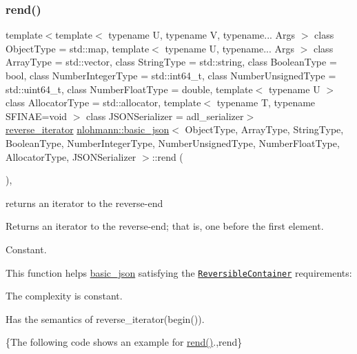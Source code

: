 \subsubsection{\texorpdfstring{rend()}{rend()}\hspace{0.1cm}{\footnotesize\ttfamily [1/2]}}
{\footnotesize\ttfamily template$<$template$<$ typename U, typename V, typename... Args $>$ class Object\+Type = std\+::map, template$<$ typename U, typename... Args $>$ class Array\+Type = std\+::vector, class String\+Type  = std\+::string, class Boolean\+Type  = bool, class Number\+Integer\+Type  = std\+::int64\+\_\+t, class Number\+Unsigned\+Type  = std\+::uint64\+\_\+t, class Number\+Float\+Type  = double, template$<$ typename U $>$ class Allocator\+Type = std\+::allocator, template$<$ typename T, typename S\+F\+I\+N\+A\+E=void $>$ class J\+S\+O\+N\+Serializer = adl\+\_\+serializer$>$ \\
\mbox{\hyperlink{classnlohmann_1_1basic__json_ac223d5560c2b05a208c88de67376c5f2}{reverse\+\_\+iterator}} \mbox{\hyperlink{classnlohmann_1_1basic__json}{nlohmann\+::basic\+\_\+json}}$<$ Object\+Type, Array\+Type, String\+Type, Boolean\+Type, Number\+Integer\+Type, Number\+Unsigned\+Type, Number\+Float\+Type, Allocator\+Type, J\+S\+O\+N\+Serializer $>$\+::rend (\begin{DoxyParamCaption}{ }\end{DoxyParamCaption})\hspace{0.3cm}{\ttfamily [inline]}, {\ttfamily [noexcept]}}



returns an iterator to the reverse-\/end 

Returns an iterator to the reverse-\/end; that is, one before the first element.

  Constant.

This function helps {\ttfamily \mbox{\hyperlink{classnlohmann_1_1basic__json}{basic\+\_\+json}}} satisfying the \href{https://en.cppreference.com/w/cpp/named_req/ReversibleContainer}{\tt Reversible\+Container} requirements\+:
\begin{DoxyItemize}
\item The complexity is constant.
\item Has the semantics of {\ttfamily reverse\+\_\+iterator(begin())}.
\end{DoxyItemize}

\{The following code shows an example for {\ttfamily \mbox{\hyperlink{classnlohmann_1_1basic__json_ac77aed0925d447744676725ab0b6d535}{rend()}}}.,rend\}

